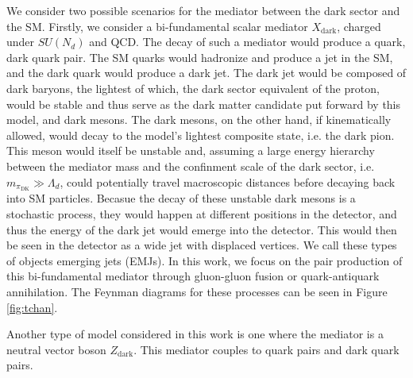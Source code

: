 We consider two possible scenarios for the mediator between the dark sector and the SM. Firstly, we consider a bi-fundamental scalar mediator $X_{\text{dark}}$, charged under $SU(N_d)$ and QCD. The decay of such a mediator would produce a quark, dark quark pair. The SM quarks would hadronize and produce a jet in the SM, and the dark quark would produce a dark jet. The dark jet would be composed of dark baryons, the lightest of which, the dark sector equivalent of the proton, would be stable and thus serve as the dark matter candidate put forward by this model, and dark mesons. The dark mesons, on the other hand, if kinematically allowed, would decay to the model's lightest composite state, i.e. the dark pion. This meson would itself be unstable and, assuming a large energy hierarchy between the mediator mass and the confinment scale of the dark sector, i.e. $m_{\pi_{\text{DK}}} \gg \Lambda_d$, could potentially travel macroscopic distances before decaying back into SM particles. Becasue the decay of these unstable dark mesons is a stochastic process, they would happen at different positions in the detector, and thus the energy of the dark jet would emerge into the detector. This would then be seen in the detector as a wide jet with displaced vertices. We call these types of objects emerging jets (EMJs). In this work, we focus on the pair production of this bi-fundamental mediator through gluon-gluon fusion or quark-antiquark annihilation. The Feynman diagrams for these processes can be seen in Figure \ref{fig:tchan}.

Another type of model considered in this work is one where the mediator is a neutral vector boson $Z_{\text{dark}}$. This mediator couples to quark pairs and dark quark pairs.






